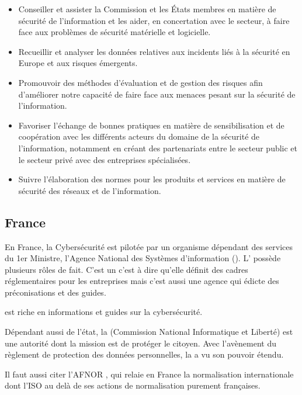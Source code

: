 \begin{itemize}
  \item Conseiller et assister la Commission et les États membres en matière de sécurité de l'information et les aider, en concertation avec le secteur, à faire face aux problèmes de sécurité matérielle et logicielle.
  \item Recueillir et analyser les données relatives aux incidents liés à la sécurité en Europe et aux risques émergents.
  \item Promouvoir des méthodes d'évaluation et de gestion des risques afin d'améliorer notre capacité de faire face aux menaces pesant sur la sécurité de l'information.
  \item Favoriser l'échange de bonnes pratiques en matière de sensibilisation et de coopération avec les différents acteurs du domaine de la sécurité de l'information, notamment en créant des partenariats entre le secteur public et le secteur privé avec des entreprises spécialisées.
  \item Suivre l'élaboration des normes pour les produits et services en matière de sécurité des réseaux et de l'information.
\end{itemize}

\subsection{France}

En France, la Cybersécurité est pilotée par un organisme dépendant des services du 1er Ministre,  l'Agence National des Systèmes d'information ().
L' possède plusieurs rôles de fait. C'est un  c'est à dire qu'elle définit des cadres réglementaires pour les entreprises mais c'est aussi une agence qui édicte des préconisations et des guides.

  est riche en informations et guides sur la cybersécurité.

Dépendant aussi de l'état, la  (Commission National Informatique et Liberté) est une autorité dont la mission est de protéger le citoyen. Avec l'avènement du règlement de protection des données personnelles, la  a vu son pouvoir étendu.  

Il faut aussi citer l'AFNOR , qui relaie en France la normalisation internationale dont l'ISO au delà de ses actions de normalisation purement françaises.

